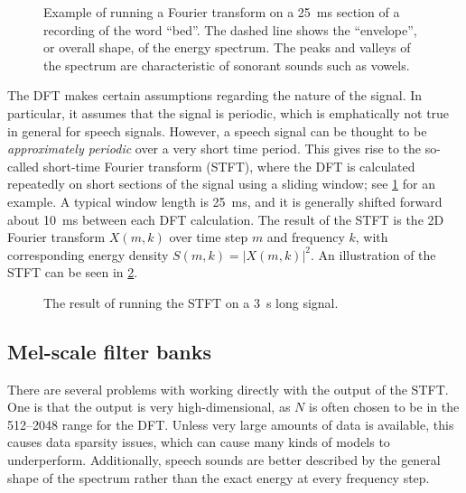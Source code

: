 \begin{figure}
  \centering
  
  \caption{\label{fig:sftf}Example of running a Fourier transform on a \SI{25}{\ms} section of a recording of the word ``bed''.
  The dashed line shows the ``envelope'', or overall shape, of the energy spectrum.
  The peaks and valleys of the spectrum are characteristic of sonorant sounds such as vowels.}
\end{figure}

The DFT makes certain assumptions regarding the nature of the signal.
In particular, it assumes that the signal is periodic, which is emphatically not true in general for speech signals.
However, a speech signal can be thought to be \emph{approximately periodic} over a very short time period.
This gives rise to the so-called short-time Fourier transform (STFT), where the DFT is calculated repeatedly on short sections of the signal using a sliding window; see \cref{fig:sftf} for an example.
A typical window length is \SI{25}{\ms}, and it is generally shifted forward about \SI{10}{\ms} between each DFT calculation.
The result of the STFT is the 2D Fourier transform $X(m,k)$ over time step $m$ and frequency $k$, with corresponding energy density $S(m,k) = \left|X(m, k)\right|^2$.
An illustration of the STFT can be seen in \cref{fig:spectrogram}.

\begin{figure}
  \centering

  \caption{\label{fig:spectrogram}The result of running the STFT on a \SI{3}{\s} long signal.}
\end{figure}

\subsection{Mel-scale filter banks}

There are several problems with working directly with the output of the STFT. One is that the output is very high-dimensional, as $N$ is often chosen to be in the \numrange{512}{2048} range for the DFT.
Unless very large amounts of data is available, this causes data sparsity issues, which can cause many kinds of models to underperform.
Additionally, speech sounds are better described by the general shape of the spectrum rather than the exact energy at every frequency step.

